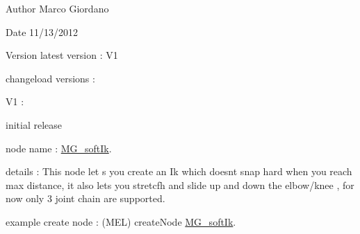 \begin{DoxyAuthor}{Author}
Marco Giordano 
\end{DoxyAuthor}
\begin{DoxyDate}{Date}
11/13/2012 
\end{DoxyDate}
\begin{DoxyVersion}{Version}
latest version \-: V1 

changeload versions \-: \par
 V1 \-: \par

\begin{DoxyItemize}
\item initial release \par

\end{DoxyItemize}
\end{DoxyVersion}
node name \-: \hyperlink{class_m_g__soft_ik}{M\-G\-\_\-soft\-Ik}.

details \-: This node let s you create an Ik which doesnt snap hard when you reach max distance, it also lets you stretcfh and slide up and down the elbow/knee , for now only 3 joint chain are supported.

example create node \-: (M\-E\-L) create\-Node \hyperlink{class_m_g__soft_ik}{M\-G\-\_\-soft\-Ik}. 

